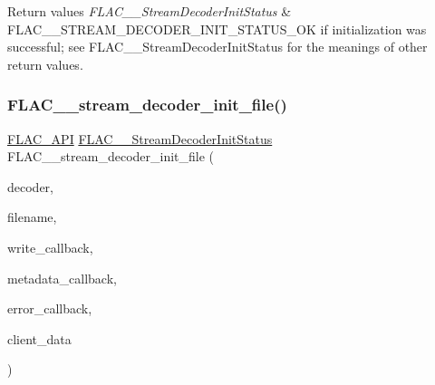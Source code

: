 \begin{DoxyRetVals}{Return values}
{\em F\+L\+A\+C\+\_\+\+\_\+\+Stream\+Decoder\+Init\+Status} & {\ttfamily F\+L\+A\+C\+\_\+\+\_\+\+S\+T\+R\+E\+A\+M\+\_\+\+D\+E\+C\+O\+D\+E\+R\+\_\+\+I\+N\+I\+T\+\_\+\+S\+T\+A\+T\+U\+S\+\_\+\+OK} if initialization was successful; see F\+L\+A\+C\+\_\+\+\_\+\+Stream\+Decoder\+Init\+Status for the meanings of other return values. \\
\hline
\end{DoxyRetVals}
\mbox{\label{group__flac__stream__decoder_ga1692108a97012d1c5f79baf7df012c33}} 
\subsubsection{\texorpdfstring{FLAC\_\_stream\_decoder\_init\_file()}{FLAC\_\_stream\_decoder\_init\_file()}}
{\footnotesize\ttfamily \mbox{\hyperlink{group__flac__export_ga56ca07df8a23310707732b1c0007d6f5}{F\+L\+A\+C\+\_\+\+A\+PI}} \mbox{\hyperlink{group__flac__stream__decoder_gaaed54a24ac6310d29c5cafba79759c44}{F\+L\+A\+C\+\_\+\+\_\+\+Stream\+Decoder\+Init\+Status}} F\+L\+A\+C\+\_\+\+\_\+stream\+\_\+decoder\+\_\+init\+\_\+file (\begin{DoxyParamCaption}\item[{\mbox{\hyperlink{struct_f_l_a_c_____stream_decoder}{F\+L\+A\+C\+\_\+\+\_\+\+Stream\+Decoder}} $\ast$}]{decoder,  }\item[{const char $\ast$}]{filename,  }\item[{\mbox{\hyperlink{group__flac__stream__decoder_ga61e48dc2c0d2f6c5519290ff046874a4}{F\+L\+A\+C\+\_\+\+\_\+\+Stream\+Decoder\+Write\+Callback}}}]{write\+\_\+callback,  }\item[{\mbox{\hyperlink{group__flac__stream__decoder_ga6aa87c01744c1c601b7f371f627b6e14}{F\+L\+A\+C\+\_\+\+\_\+\+Stream\+Decoder\+Metadata\+Callback}}}]{metadata\+\_\+callback,  }\item[{\mbox{\hyperlink{group__flac__stream__decoder_gac896ee6a12668e9015fab4fbc6aae996}{F\+L\+A\+C\+\_\+\+\_\+\+Stream\+Decoder\+Error\+Callback}}}]{error\+\_\+callback,  }\item[{\mbox{\hyperlink{_s_d_l__opengles2__gl2ext_8h_ae5d8fa23ad07c48bb609509eae494c95}{void}} $\ast$}]{client\+\_\+data }\end{DoxyParamCaption})}


